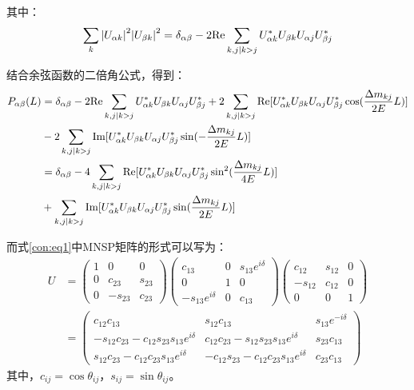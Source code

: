 \documentclass[10pt,a4paper]{article}
\begin{document}
其中：\begin{equation}
\label{con:eq17}
\sum_{k}{|U_{\alpha k}|}^{2}{|U_{\beta k}|}^{2}=\delta_{\alpha\beta}-2{\rm Re}\sum_{k,j |k>j}U_{\alpha k}^{*}U_{\beta k}U_{\alpha j}U_{\beta j}^{*}
\end{equation}


结合余弦函数的二倍角公式，得到：
\begin{equation}
\label{con:eq18}
\begin{split}
P_{\alpha\beta}(L)&=\delta_{\alpha\beta}-2{\rm Re}\sum_{k,j |k>j}U_{\alpha k}^{*}U_{\beta k}U_{\alpha j}U_{\beta j}^{*}+2\sum_{k,j |k>j}{\rm Re}[U_{\alpha k}^{*}U_{\beta k}U_{\alpha j}U_{\beta j}^{*}\cos(\frac{\Delta m_{kj}}{2E}L)]\\&-2\sum_{k,j |k>j}{\rm Im}[U_{\alpha k}^{*}U_{\beta k}U_{\alpha j}U_{\beta j}^{*}\sin(-\frac{\Delta m_{kj}}{2E}L)]
\\
&=\delta_{\alpha\beta}-4\sum_{k,j |k>j}{\rm Re}[U_{\alpha k}^{*}U_{\beta k}U_{\alpha j}U_{\beta j}^{*}\sin^2(\frac{\Delta m_{kj}}{4E}L)]
\\&+\sum_{k,j |k>j}{\rm Im}[U_{\alpha k}^{*}U_{\beta k}U_{\alpha j}U_{\beta j}^{*}\sin(\frac{\Delta m_{kj}}{2E}L)]
\end{split}
\end{equation}


而式\eqref{con:eq1}中MNSP矩阵的形式可以写为：
\begin{equation}
\label{con:eq19}
\begin{aligned}
U &= \begin{pmatrix}
 1 & 0 & 0 \\
 0 & c_{23} & s_{23} \\
 0 & -s_{23} & c_{23}
 \end{pmatrix}
 \begin{pmatrix}
 c_{13} & 0 & s_{13}e^{i\delta} \\
 0 & 1 & 0 \\
 -s_{13}e^{i\delta} & 0 & c_{13}
 \end{pmatrix} 
 \begin{pmatrix}
 c_{12} & s_{12} & 0 \\
 -s_{12} & c_{12} & 0 \\
 0 & 0 & 1
 \end{pmatrix}
 \\&=
 \begin{pmatrix}
 c_{12}c_{13} & s_{12}c_{13} & s_{13}e^{-i \delta} \\
 -s_{12}c_{23}-c_{12}s_{23}s_{13}e^{i\delta} & c_{12}c_{23}-s_{12}s_{23}s_{13}e^{i\delta} & s_{23}c_{13} \\
 s_{12}c_{23}-c_{12}c_{23}s_{13}e^{i\delta} &-c_{12}s_{23}-c_{12}c_{23}s_{13}e^{i\delta} & c_{23}c_{13}
 \end{pmatrix}
 \end{aligned}
\end{equation}
其中，$c_{ij}=\cos\theta_{ij}，s_{ij}=\sin\theta_{ij}$。
\end{document}
